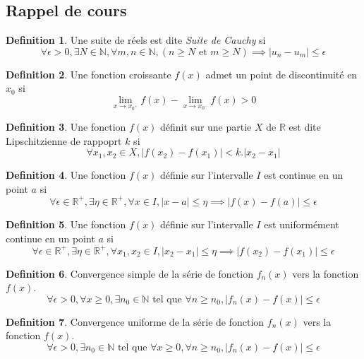 \documentclass[]{book}
\theoremstyle{definition}
\newtheorem{defn}{Definition}
\newcommand{\bb}[1]{\mathbb{#1}}
\newcommand{\R}{\bb{R}}
\newcommand{\N}{\bb{N}}
\begin{document}
\subsection*{Rappel de cours}
\begin{defn}
Une suite de r\'eels est dite \emph{Suite de Cauchy} si
$$
\forall \epsilon > 0, \exists N \in \N, \forall m,n \in \N, (n \geq N \text{ et } m \geq N) \implies |u_n - u_m| \leq \epsilon 
$$
\end{defn}

\begin{defn}
Une fonction croissante $f(x)$ admet un point de discontinuit\'e en $x_0$ si 
$$\lim_{x \to x_{0^{+}}}f(x) - \lim_{x \to x_{0^{-}}}f(x) > 0$$
\end{defn}


\begin{defn}
Une fonction $f(x)$ d\'efinit sur une partie $X$ de $\R$ est dite Lipschitzienne de rappoprt $k$ si 
$$
\forall x_1, x_2 \in X, |f(x_2)-f(x_1)| < k.|x_2-x_1|
$$
\end{defn}

\begin{defn}
Une fonction $f(x)$ d\'efinie sur l'intervalle $I$ est continue en un point $a$ si 
$$
\forall \epsilon \in \R^{+}, \exists \eta  \in \R^{+}, \forall x \in I, |x-a| \leq \eta \implies  |f(x)-f(a)| \leq \epsilon
$$
\end{defn}

\begin{defn}
Une fonction $f(x)$ d\'efinie sur l'intervalle $I$ est uniform\'ement continue en un point $a$ si 
$$
\forall \epsilon \in \R^{+}, \exists \eta  \in \R^{+}, \forall x_1, x_2 \in I, |x_2-x_1| \leq \eta \implies  |f(x_2)-f(x_1)| \leq \epsilon
$$
\end{defn}


\begin{defn}
Convergence simple de la s\'erie de fonction $f_n(x)$ vers la fonction $f(x)$.
$$\forall \epsilon > 0, \forall x \geq 0, \exists n_0 \in \N \text{ tel que } \forall n \geq n_0, |f_n(x) - f(x)| \leq \epsilon$$
\end{defn}

\begin{defn}
Convergence uniforme de la s\'erie de fonction $f_n(x)$ vers la fonction $f(x)$.
$$\forall \epsilon > 0, \exists n_0 \in \N  \text{ tel que }  \forall x \geq 0, \forall n \geq n_0, |f_n(x) - f(x)| \leq \epsilon$$
\end{defn}
\end{document}
